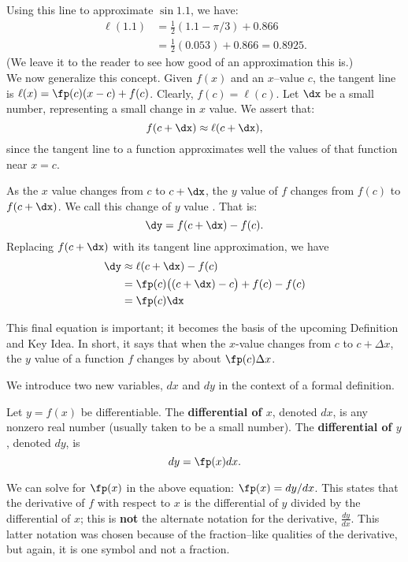 Using this line to approximate $\sin 1.1$, we have:
\begin{align*}
	\ell(1.1) &= \frac12(1.1-\pi/3)+0.866 \\
					&= \frac12(0.053)+0.866 = 0.8925.
\end{align*}
(We leave it to the reader to see how good of an approximation this is.)\\

We now generalize this concept. Given $f(x)$ and an $x$--value $c$,  the tangent line is $\ell(x) = \fp(c)(x-c)+f(c)$. Clearly, $f(c) = \ell(c)$. Let $\dx$ be a small number, representing a small change in $x$ value. We assert that:
\[
f(c+\dx) \approx \ell(c+\dx),
\]
 since the tangent line to a function approximates well the values of that function near $x=c$. 

As the $x$ value changes from $c$ to $c+\dx$, the $y$ value of $f$ changes from $f(c)$ to $f(c+\dx)$. We call this change of $y$ value \dy. That is:
\[
\dy = f(c+\dx)-f(c).
\]
Replacing $f(c+\dx)$ with its tangent line approximation, we have 
\begin{align} \dy &\approx \ell(c+\dx) - f(c) \notag\\
								&= \fp(c)\big((c+\dx)-c\big)+f(c) - f(c)\notag \\
								&=\fp(c)\dx		\label{eq:differential}
\end{align}

This final equation is important; it becomes the basis of the upcoming Definition and Key Idea. In short, it says that when the $x$-value changes from $c$ to $c+\Delta x$, the $y$ value of a function $f$ changes by about $\fp(c)\Delta x$.

We introduce two new variables, $dx$ and $dy$ in the context of a formal definition. %

{Let $y=f(x)$ be differentiable. The \textbf{differential of $x$}, denoted $dx$, is any nonzero real number (usually taken to be a small number). The \textbf{differential of $y$}, denoted $dy$, is 
\[
dy = \fp(x)dx.
\]
}

We can solve for $\fp(x)$ in the above equation: $\fp(x) = dy/dx$. This states that the derivative of $f$ with respect to $x$ is the differential of $y$ divided by the differential of $x$; this is \textbf{not} the alternate notation for the derivative, $\frac{dy}{dx}$. This latter notation was chosen because of the fraction--like qualities of the derivative, but again, it is one symbol and not a fraction.

